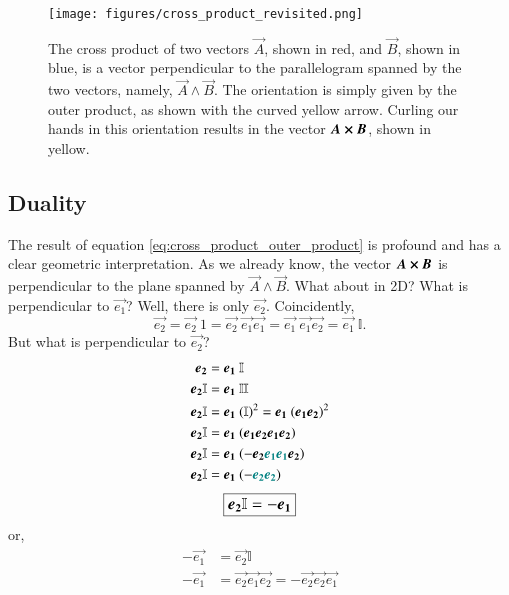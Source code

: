 \begin{figure}[H]
    \centering
    \texttt{[image: figures/cross\_product\_revisited.png]}
    \caption{The cross product of two vectors $\vec{A}$, shown in red, and $\vec{B}$, shown in blue, is a vector perpendicular to the parallelogram spanned by the two vectors, namely, $\vec{A} \wedge \vec{B}$. The orientation is simply given by the outer product, as shown with the curved yellow arrow. Curling our hands in this orientation results in the vector $\vec{A} \cross \vec{B}$, shown in yellow.}
    \label{fig:cross_product_revisited}
\end{figure}



\subsection{Duality} \label{sec:duality}
The result of equation \eqref{eq:cross_product_outer_product} is profound and has a clear geometric interpretation. As we already know, the vector $ \vec{A}  \cross \vec{B}  $ is perpendicular to the plane spanned by $ \vec{A}  \wedge \vec{B} $. What about in 2D? What is perpendicular to $\vec{e_1}$? Well, there is only $\vec{e_2}$. Coincidently, 
$$ \vec{e_2} = \vec{e_2} \ 1 = \vec{e_2}  \ \vec{e_1} \vec{e_1}= \vec{e_1}  \ \vec{e_1} \vec{e_2} = \vec{e_1}  \ \mathbb{I}.$$
But what is perpendicular to $\vec{e_2}$?
\begin{align*}
\vec{e_2} &= \vec{e_1}  \ \mathbb{I} \\
\vec{e_2} \mathbb{I} &= \vec{e_1}  \ \mathbb{I} \mathbb{I} \\
\vec{e_2} \mathbb{I} &= \vec{e_1}  \ (\mathbb{I})^2=  \vec{e_1}  \ (\vec{e_1} \vec{e_2} )^2 \\
\vec{e_2} \mathbb{I} &=  \vec{e_1}  \ (\vec{e_1} \vec{e_2}  \vec{e_1} \vec{e_2}  )\\
\vec{e_2} \mathbb{I} &=  \vec{e_1}  \ ( - \vec{e_2}  \color{teal}{\vec{e_1} \vec{e_1}} \color{black} \vec{e_2}  )\\
\vec{e_2} \mathbb{I} &=  \vec{e_1}  \ (-   \color{teal}{\vec{e_2} \vec{e_2}} \color{black}  )
\end{align*}
\begin{equation} \label{eq:dual_3d_test_1}
\large\boxed{\vec{e_2} \mathbb{I} =  -\vec{e_1}}
\end{equation}
or,
\begin{align*}
 -\vec{e_1} &=  \vec{e_2} \mathbb{I} \\
 -\vec{e_1} &=\vec{e_2} \vec{e_1} \vec{e_2} = - \vec{e_2} \vec{e_2} \vec{e_1}
\end{align*}
